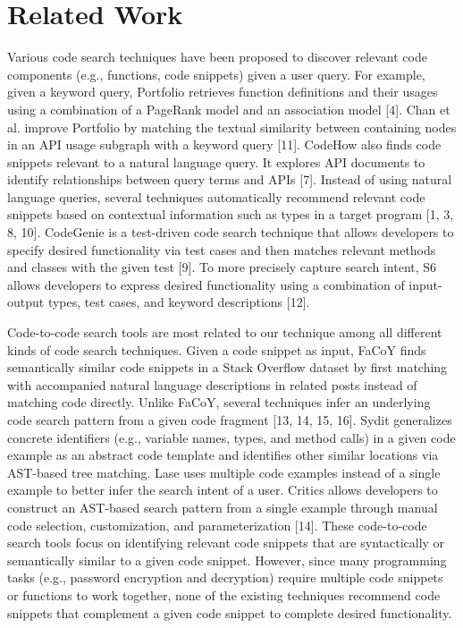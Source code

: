 \section{Related Work}
\label{sec:related}
Various code search techniques have been proposed to discover relevant code components (e.g., functions, code snippets) given a user query. For example, given a keyword query, Portfolio retrieves function definitions and their usages using a combination of a PageRank model and an association model [4]. Chan et al. improve Portfolio by matching the textual similarity between containing nodes in an API usage subgraph with a keyword query [11]. CodeHow also finds code snippets relevant to a natural language query. It explores API documents to identify relationships between query terms and APIs [7]. Instead of using natural language queries, several techniques automatically recommend relevant code snippets based on contextual information such as types in a target program [1, 3, 8, 10]. CodeGenie is a test-driven code search technique that allows developers to specify desired functionality via test cases and then matches relevant methods and classes with the given test [9]. To more precisely capture search intent, S6 allows developers to express desired functionality using a combination of input-output types, test cases, and keyword descriptions [12].

Code-to-code search tools are most related to our technique among all different kinds of code search techniques. Given a code snippet as input, FaCoY finds semantically similar code snippets in a Stack Overflow dataset by first matching with accompanied natural language descriptions in related posts instead of matching code directly. Unlike FaCoY, several techniques infer an underlying code search pattern from a given code fragment [13, 14, 15, 16]. Sydit generalizes concrete identifiers (e.g., variable names, types, and method calls) in a given code example as an abstract code template and identifies other similar locations via AST-based tree matching. Lase uses multiple code examples instead of a single example to better infer the search intent of a user. Critics allows developers to construct an AST-based search pattern from a single example through manual code selection, customization, and parameterization [14]. These code-to-code search tools focus on identifying relevant code snippets that are syntactically or semantically similar to a given code snippet. However, since many programming tasks (e.g., password encryption and decryption) require multiple code snippets or functions to work together, none of the existing techniques recommend code snippets that complement a given code snippet to complete desired functionality.
